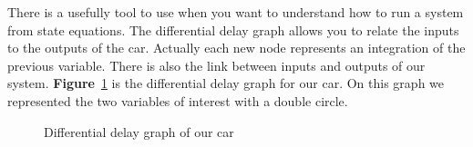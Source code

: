 There is a usefully tool to use when you want to understand
how to run a system from state equations. The differential delay
graph allows you to relate the inputs to the outputs of the car.
Actually each new node represents an integration of the previous variable. There is also the link between
inputs and outputs of our system. \textbf{Figure}~\ref{fig:diff_delay}
is the differential delay graph for our car. On this graph we represented
the two variables of interest with a double circle.

\begin{figure}[!ht]
    \centering
    \caption{Differential delay graph of our car}
    \label{fig:diff_delay}
\end{figure}

\newpage